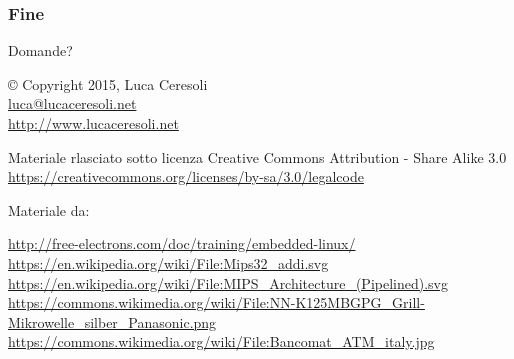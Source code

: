 \documentclass[xetex,table]{beamer}
\begin{document}
\begin{frame}
\frametitle{Fine}

  \begin{center}
    {\Huge Domande?}

    \vspace{0.1\textheight}

    © Copyright 2015, Luca Ceresoli\\
    \href{mailto:luca@lucaceresoli.net}{luca@lucaceresoli.net}\\
    \url{http://www.lucaceresoli.net}

  \vspace{0.05\textheight}

   \tiny
   Materiale rlasciato sotto
   licenza Creative Commons Attribution - Share Alike 3.0 \\
   \url{https://creativecommons.org/licenses/by-sa/3.0/legalcode} \\
  \end{center}

  \vspace{0.05\textheight}

  Materiale da:

  \vspace{0.01\textheight}
  \begin{tiny}
    {
      \setlength{\parskip}{0cm plus0mm minus3mm}
      \fontsize{4}{0}
      \url{http://free-electrons.com/doc/training/embedded-linux/}\\
      \url{https://en.wikipedia.org/wiki/File:Mips32_addi.svg}\\
      \url{https://en.wikipedia.org/wiki/File:MIPS_Architecture_(Pipelined).svg}\\
      \url{https://commons.wikimedia.org/wiki/File:NN-K125MBGPG_Grill-Mikrowelle_silber_Panasonic.png}\\
      \url{https://commons.wikimedia.org/wiki/File:Bancomat_ATM_italy.jpg}\\
    }
  \end{tiny}
\end{frame}
\end{document}
